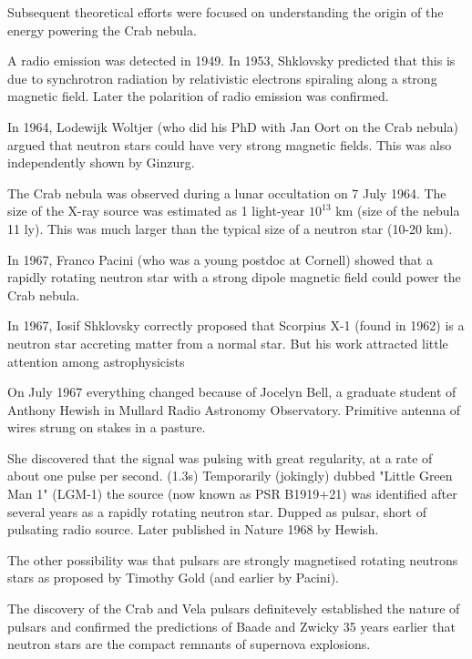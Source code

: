 Subsequent theoretical efforts were focused on understanding the origin of the energy powering the Crab nebula.

A radio emission was detected in 1949. 
In 1953, Shklovsky predicted that this is due to synchrotron radiation by relativistic electrons spiraling along a strong magnetic field. 
Later the polarition of radio emission was confirmed. 

In 1964, Lodewijk Woltjer (who did his PhD with Jan Oort on the Crab nebula) argued that neutron stars could have very strong magnetic fields. \cite{Woltjer64}
This was also independently shown by Ginzurg. \cite{Ginzburg64}


The Crab nebula was observed during a lunar occultation on 7 July 1964. 
The size of the X-ray source was estimated as 1 light-year $10^{13}$ km (size of the nebula 11 ly). 
This was much larger than the typical size of a neutron star (10-20 km).

In 1967, Franco Pacini (who was a young postdoc at Cornell) showed that a rapidly rotating neutron star with a strong dipole magnetic field could power the Crab nebula.

In 1967, Iosif Shklovsky correctly proposed that Scorpius X-1 (found in 1962) is a neutron star accreting matter from a normal star. \cite{Shklovsky67}
But his work attracted little attention among astrophysicists

On July 1967 everything changed because of Jocelyn Bell, a graduate student of Anthony Hewish in Mullard Radio Astronomy Observatory.
Primitive antenna of wires strung on stakes in a pasture.

She discovered that the signal was pulsing with great regularity, at a rate of about one pulse per second. (1.3s)
Temporarily (jokingly) dubbed "Little Green Man 1" (LGM-1) the source (now known as PSR B1919+21) was identified after several years as a rapidly rotating neutron star.
Dupped as pulsar, short of pulsating radio source.
Later published in Nature 1968 by Hewish. \cite{Hewish68}


The other possibility was that pulsars are strongly magnetised rotating neutrons stars as proposed by Timothy Gold (and earlier by Pacini).
\cite{Gold68}

The discovery of the Crab and Vela pulsars definitevely established the nature of pulsars and confirmed the predictions of Baade and Zwicky 35 years earlier that neutron stars are the compact remnants of supernova explosions.


